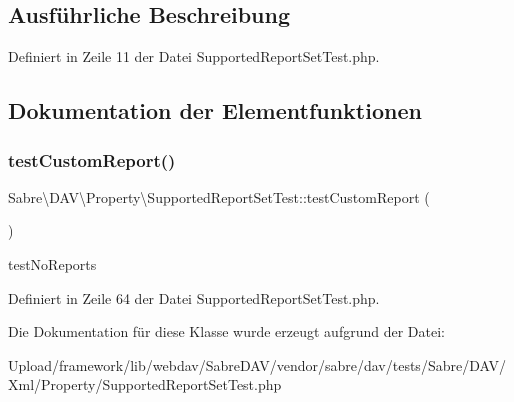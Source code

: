 \subsection{Ausführliche Beschreibung}


Definiert in Zeile 11 der Datei Supported\+Report\+Set\+Test.\+php.



\subsection{Dokumentation der Elementfunktionen}
\mbox{\label{class_sabre_1_1_d_a_v_1_1_property_1_1_supported_report_set_test_af08864d13a6878ff54c15acaf6e257de}} 
\subsubsection{\texorpdfstring{test\+Custom\+Report()}{testCustomReport()}}
{\footnotesize\ttfamily Sabre\textbackslash{}\+D\+A\+V\textbackslash{}\+Property\textbackslash{}\+Supported\+Report\+Set\+Test\+::test\+Custom\+Report (\begin{DoxyParamCaption}{ }\end{DoxyParamCaption})}

test\+No\+Reports 

Definiert in Zeile 64 der Datei Supported\+Report\+Set\+Test.\+php.



Die Dokumentation für diese Klasse wurde erzeugt aufgrund der Datei\+:\begin{DoxyCompactItemize}
\item 
Upload/framework/lib/webdav/\+Sabre\+D\+A\+V/vendor/sabre/dav/tests/\+Sabre/\+D\+A\+V/\+Xml/\+Property/Supported\+Report\+Set\+Test.\+php\end{DoxyCompactItemize}
